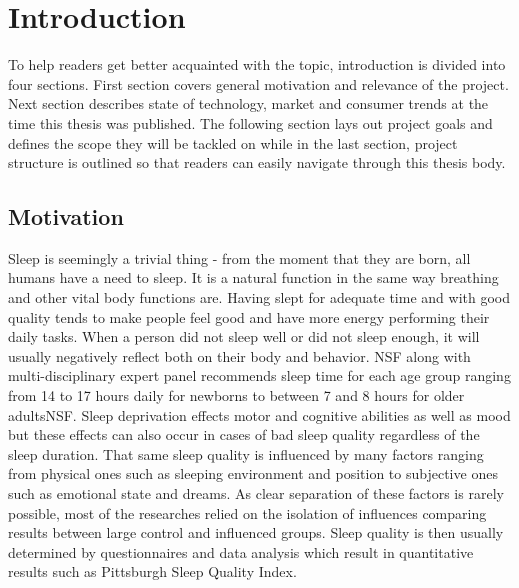 \chapter{Introduction}
\label{chap:introduction}

To help readers get better acquainted with the topic, introduction is divided into four sections. First section covers general motivation and relevance of the project. Next section describes state of technology, market and consumer trends at the time this thesis was published. The following section lays out project goals and defines the scope they will be tackled on while in the last section, project structure is outlined so that readers can easily navigate through this thesis body.


\section{Motivation}

Sleep is seemingly a trivial thing - from the moment that they are born, all humans have a need to sleep. It is a natural function in the same way breathing and other vital body functions are. Having slept for adequate time and with good quality tends to make people feel good and have more energy performing their daily tasks. When a person did not sleep well or did not sleep enough, it will usually negatively reflect both on their body and behavior. \ac{NSF} along with multi-disciplinary expert panel recommends sleep time for each age group ranging from 14 to 17 hours daily for newborns to between 7 and 8 hours for older adults\ac{NSF}. Sleep deprivation effects motor and cognitive abilities as well as mood but these effects can also occur in cases of bad sleep quality regardless of the sleep duration\cite{doi:10.1093/sleep/19.4.318}. That same sleep quality is influenced by many factors ranging from physical ones such as sleeping environment and position to subjective ones such as emotional state and dreams. As clear separation of these factors is rarely possible, most of the researches relied on the isolation of influences comparing results between large control and influenced groups. Sleep quality is then usually determined by questionnaires and data analysis which result in quantitative results such as Pittsburgh Sleep Quality Index\cite{psqi}.\\

